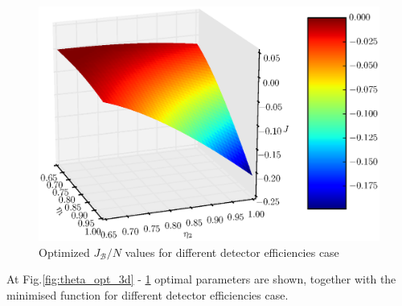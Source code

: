 \documentclass[%
master,         %
subf,           %
href,           %
colorlinks=true %
]{disser}
\numberwithin{equation}{section}
\numberwithin{figure}{section}
\begin{document}
\begin{figure}[t]
\includegraphics[scale=0.7]{J3d.eps}
\caption{Optimized $J_{\mathcal{B}}/N$ values for different detector efficiencies case}
\label{fig:J_opt_3d}
\end{figure}

At Fig.\ref{fig:theta_opt_3d} - \ref{fig:J_opt_3d} optimal parameters are shown, together with 
the minimised function for different detector efficiencies case.

\begingroup
\small
\end{document}
